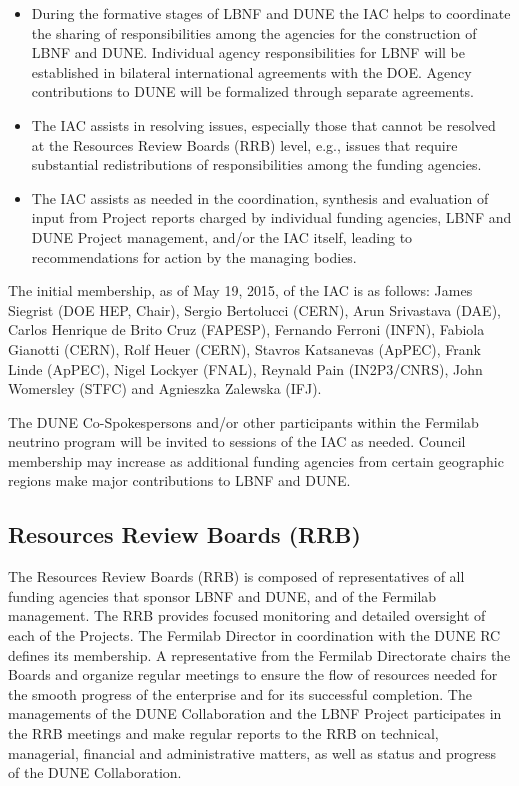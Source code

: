 \begin{itemize}
\item During the formative stages of LBNF and DUNE
the IAC helps to coordinate the sharing of responsibilities among
the agencies for the construction of LBNF and DUNE.
Individual agency responsibilities for LBNF will be established in
bilateral international agreements with the DOE. Agency contributions to
DUNE will be formalized through separate agreements.

\item The IAC assists in resolving issues, especially those
that cannot be resolved at the Resources Review Boards (RRB) level,
e.g., issues that require substantial redistributions of
responsibilities among the funding agencies.

\item The IAC assists as needed in the coordination,
synthesis and evaluation of input from Project reports charged by
individual funding agencies, LBNF and DUNE Project management,
and/or the IAC itself, leading to recommendations for action by
the managing bodies.
\end{itemize}

The initial membership, as of May 19, 2015, of the IAC is as follows:
James Siegrist (DOE HEP, Chair),
Sergio Bertolucci (CERN),
Arun Srivastava (DAE),
Carlos Henrique de Brito Cruz (FAPESP),
Fernando Ferroni (INFN),
Fabiola Gianotti (CERN),
Rolf Heuer (CERN),
Stavros Katsanevas (ApPEC),
Frank Linde (ApPEC),
Nigel Lockyer (FNAL),
Reynald Pain (IN2P3/CNRS),
John Womersley (STFC) and
Agnieszka Zalewska (IFJ).

The DUNE Co-Spokespersons and/or other participants within
the Fermilab neutrino program will be invited to sessions of the IAC as
needed. Council membership may increase as additional funding agencies
from certain geographic regions make major contributions to LBNF and DUNE.

\subsection{Resources Review Boards (RRB)}

The Resources Review Boards (RRB) is composed of representatives of all
funding agencies that sponsor LBNF and DUNE, and of the Fermilab
management. The RRB provides focused monitoring and detailed oversight
of each of the Projects. The Fermilab Director in coordination
with the DUNE RC defines its membership. A representative from the
Fermilab Directorate chairs the Boards and
organize regular meetings to ensure the flow of resources needed
for the smooth progress of the enterprise %
and for its successful completion. %
The managements of the
DUNE Collaboration and the LBNF Project participates in the RRB meetings
and make regular reports to the RRB on technical, managerial,
financial and administrative matters, as well as status and
progress of the DUNE Collaboration.

